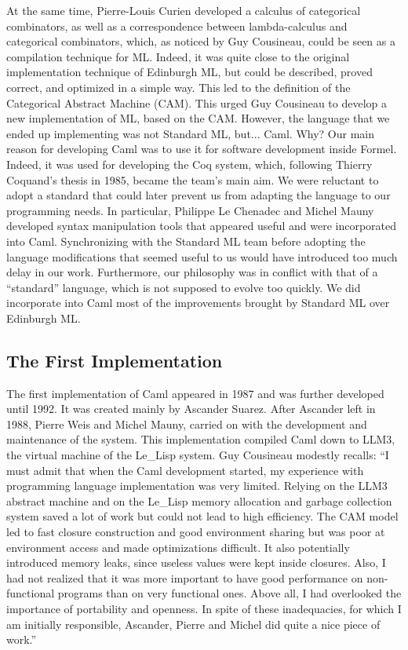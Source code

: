 \documentclass[14pt]{matmex-diploma-custom}
\begin{document}
\begin{itemize}
\begin{itemize}
At the same time, Pierre-Louis Curien developed a calculus of categorical combinators, as well as a correspondence between lambda-calculus and categorical combinators, which, as noticed by Guy Cousineau, could be seen as a compilation technique for ML. Indeed, it was quite close to the original implementation technique of Edinburgh ML, but could be described, proved correct, and optimized in a simple way. This led to the definition of the Categorical Abstract Machine (CAM).
This urged Guy Cousineau to develop a new implementation of ML, based on the CAM. However, the language that we ended up implementing was not Standard ML, but... Caml. Why? Our main reason for developing Caml was to use it for software development inside Formel. Indeed, it was used for developing the Coq system, which, following Thierry Coquand's thesis in 1985, became the team's main aim. We were reluctant to adopt a standard that could later prevent us from adapting the language to our programming needs. In particular, Philippe Le Chenadec and Michel Mauny developed syntax manipulation tools that appeared useful and were incorporated into Caml. Synchronizing with the Standard ML team before adopting the language modifications that seemed useful to us would have introduced too much delay in our work. Furthermore, our philosophy was in conflict with that of a “standard” language, which is not supposed to evolve too quickly. We did incorporate into Caml most of the improvements brought by Standard ML over Edinburgh ML.

\subsection{The First Implementation}
The first implementation of Caml appeared in 1987 and was further developed until 1992. It was created mainly by Ascander Suarez. After Ascander left in 1988, Pierre Weis and Michel Mauny, carried on with the development and maintenance of the system. This implementation compiled Caml down to LLM3,
the virtual machine of the Le\_Lisp system. Guy Cousineau modestly recalls: “I must admit that when the Caml development started, my experience with programming language implementation was very limited. Relying on the LLM3 abstract machine and on the Le\_Lisp memory allocation and garbage collection system saved a lot of work but could not lead to high efficiency. The CAM model led to fast closure construction and good environment sharing but was poor at environment access and made optimizations difficult. It also potentially introduced memory leaks, since useless values were kept inside closures. Also, I had not realized that it was more important to have good performance on non-functional programs than on very functional ones. Above all, I had overlooked the importance of portability and openness. In spite of these inadequacies, for which I am initially responsible, Ascander, Pierre and Michel did quite a nice piece of work.”

\end{itemize}
\end{itemize}
\end{document}
